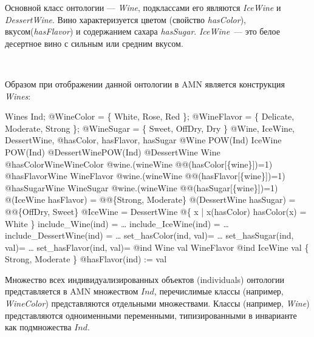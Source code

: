\begin{multicols}{2}
Основной класс онтологии --- {\it Wine}, подклассами
его являются {\it IceWine} и {\it DessertWine}.
Вино характеризуется цветом (свойство {\it hasColor}),
вкусом\linebreak ({\it hasFlavor}) и содержанием сахара {\it hasSugar}.
{\it IceWine}~--- это белое десертное вино с сильным или средним вкусом.

\begin{figure*} %
\vspace*{1pt}
\begin{center}
\mbox{%
\epsfxsize=125.57mm
}
\end{center}
\end{figure*}

Образом при отображении данной онтологии в AMN является конструкция
{\it Wines}:

\begin{prog}
\brefinement Wines
\bsets Ind;
@WineColor = \{ White, Rose, Red \};
@WineFlavor = \{ Delicate, Moderate, Strong \};
@WineSugar = \{ Sweet, OffDry, Dry \}
\bvariables 
@Wine, IceWine, DessertWine, 
@hasColor, hasFlavor, hasSugar
\binvariant
@Wine \in POW(Ind) \land IceWine \in POW(Ind) \land 
@DessertWine\in POW(Ind) \land
@DessertWine \subseteq Wine \land
@hasColor\in Wine\leftrightarrow WineColor \land 
@\forall wine.(wine\in Wine\Rightarrow
@@\bcard(hasColor[\{wine\}])=1) \land
@hasFlavor\in Wine \leftrightarrow WineFlavor \land
@\forall wine.(wine\in Wine\Rightarrow
@@\bcard(hasFlavor[\{wine\}])=1) \land
@hasSugar\in Wine \leftrightarrow WineSugar  \land
@\forall wine.(wine\in Wine\Rightarrow
@@\bcard(hasSugar[\{wine\}])=1) \land
@\bran(IceWine \triangleleft hasFlavor) =
@@\{Strong, Moderate\} \land
@\bran(DessertWine \triangleleft hasSugar) =
@@\{OffDry, Sweet\} \land
@IceWine = DessertWine \cap
@\{ x | x\in \bdom(hasColor) \land hasColor(x) = White  \}
\boperations
include\_Wine(ind) = \dots
include\_IceWine(ind) = \dots
include\_DessertWine(ind) = \dots
set\_hasColor(ind, val)= \dots
set\_hasSugar(ind, val)= \dots
set\_hasFlavor(ind, val)=
\bpre 
@ind \in Wine \land val \in WineFlavor \land 
@ind \in IceWine \Rightarrow val \in \{ Strong, Moderate \}
\bthen 
@hasFlavor(ind) := val
\bend
\end{prog}

Множество всех индивидуализированных объек\-тов (individuals)
онтологии представляется в AMN множеством $Ind$,
перечислимые классы (например, {\it WineColor}) представляются
отдельными множествами. Классы (например, {\it Wine}) пред\-став\-ля\-ют\-ся
одноименными переменными, типизированными в инварианте как подмножества\linebreak
 $Ind$.


\end{multicols}
